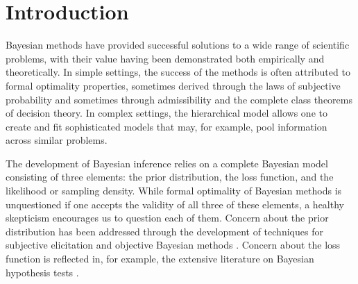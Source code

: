 \documentclass[ba]{imsart}
\begin{document}
\begin{frontmatter}

\begin{keyword}
\end{keyword}

\end{frontmatter}

\section{Introduction}
Bayesian methods have provided successful solutions to a wide range of scientific problems, with their value
having been demonstrated both empirically and theoretically.  
In simple settings, the success of the methods is often attributed to formal optimality properties, sometimes derived
through the laws of subjective probability 
and sometimes through admissibility and the complete class
theorems of decision theory.  In complex settings, the hierarchical model allows one to create 
and fit sophisticated models that may, for example, pool information across similar problems.  

The development of Bayesian inference relies on a complete Bayesian model consisting of 
three elements:  the prior distribution, the loss function, and the likelihood or sampling density.  While formal optimality of Bayesian methods is unquestioned if one accepts the validity of all three of these elements, a healthy skepticism encourages us to question each of them.  Concern about the prior distribution has been addressed through the development of techniques for subjective elicitation \citep{garthwaite2005, ohagan2006} and objective Bayesian methods \citep{berger2006}.  
Concern about the loss function is reflected in, for example, the
extensive literature on Bayesian hypothesis tests \citep{kass1995}.  
\end{document}
